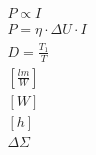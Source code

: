 \documentclass[12pt,a4paper,notitlepage]{article}
\begin{document}
\begin{align}
P \propto I\\
P = \eta \cdot \Delta U \cdot I\\
D = \frac{T_1}{T}\\
\left[\frac{lm}{W}\right]\\
\left[W\right]\\
\left[h\right]\\
\Delta\Sigma
\end{align}
\end{document}
